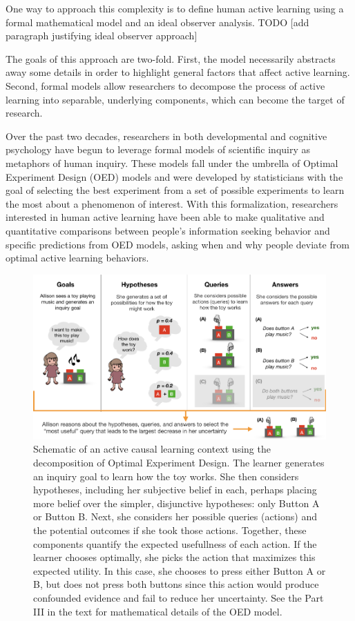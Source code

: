 \documentclass[english,floatsintext,man]{apa6}
\theoremstyle{definition}
\theoremstyle{definition}
\theoremstyle{definition}
\theoremstyle{remark}
\begin{document}
One way to approach this complexity is to define human active learning
using a formal mathematical model and an ideal observer analysis. TODO
{[}add paragraph justifying ideal observer approach{]}

The goals of this approach are two-fold. First, the model necessarily
abstracts away some details in order to highlight general factors that
affect active learning. Second, formal models allow researchers to
decompose the process of active learning into separable, underlying
components, which can become the target of research.

Over the past two decades, researchers in both developmental and
cognitive psychology have begun to leverage formal models of scientific
inquiry as metaphors of human inquiry. These models fall under the
umbrella of Optimal Experiment Design (OED) models and were developed by
statisticians with the goal of selecting the best experiment from a set
of possible experiments to learn the most about a phenomenon of
interest. With this formalization, researchers interested in human
active learning have been able to make qualitative and quantitative
comparisons between people's information seeking behavior and specific
predictions from OED models, asking when and why people deviate from
optimal active learning behaviors.

\begin{figure}[tb]
\includegraphics[width=0.95\linewidth]{macdonald_cada_files/figure-latex/unnamed-chunk-1-1} \caption{Schematic of an active causal learning context using the decomposition of Optimal Experiment Design. The learner generates an inquiry goal to learn how the toy works. She then considers hypotheses, including her subjective belief in each, perhaps placing more belief over the simpler, disjunctive hypotheses: only Button A or Button B. Next, she considers her possible queries (actions) and the potential outcomes if she took those actions. Together, these components quantify the expected usefullness of each action. If the learner chooses optimally, she picks the action that maximizes this expected utility. In this case, she chooses to press either Button A or B, but does not press both buttons since this action would produce confounded evidence and fail to reduce her uncertainty. See the Part III in the text for mathematical details of the OED model.}\label{fig:unnamed-chunk-1}
\end{figure}
\end{document}
